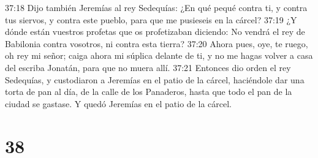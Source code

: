 37:18 Dijo también Jeremías al rey Sedequías: ¿En qué pequé contra ti, y contra tus siervos, y contra este pueblo, para que me pusieseis en la cárcel?  
37:19 ¿Y dónde están vuestros profetas que os profetizaban diciendo: No vendrá el rey de Babilonia contra vosotros, ni contra esta tierra?  
37:20 Ahora pues, oye, te ruego, oh rey mi señor; caiga ahora mi súplica delante de ti, y no me hagas volver a casa del escriba Jonatán, para que no muera allí.  
37:21 Entonces dio orden el rey Sedequías, y custodiaron a Jeremías en el patio de la cárcel, haciéndole dar una torta de pan al día, de la calle de los Panaderos, hasta que todo el pan de la ciudad se gastase. Y quedó Jeremías en el patio de la cárcel.  

\chapter{38}

